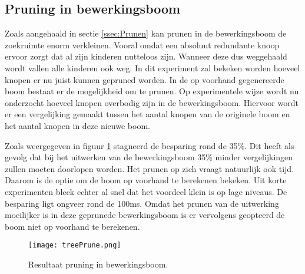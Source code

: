 \documentclass[Main.tex]{subfiles}
\begin{document}
\subsection{Pruning in bewerkingsboom} \label{ssec:pruning}
Zoals aangehaald in sectie \ref{ssec:Prunen} kan prunen in de bewerkingsboom de zoekruimte enorm verkleinen. Vooral omdat een absoluut redundante knoop ervoor zorgt dat al zijn kinderen nutteloos zijn. Wanneer deze dus weggehaald wordt vallen alle kinderen ook weg. In dit experiment zal bekeken worden hoeveel knopen er nu juist kunnen gepruned worden.
In de op voorhand gegenereerde boom bestaat er de mogelijkheid om te prunen. Op experimentele wijze wordt nu onderzocht hoeveel knopen overbodig zijn in de bewerkingsboom. Hiervoor wordt er een vergelijking gemaakt tussen het aantal knopen van de originele boom en het aantal knopen in deze nieuwe boom.
\par Zoals weergegeven in figuur \ref{fig:pruningInBewerkingsboom} stagneerd de besparing rond de 35\%. Dit heeft als gevolg dat bij het uitwerken van de bewerkingsboom 35\% minder vergelijkingen zullen moeten doorlopen worden. Het prunen op zich vraagt natuurlijk ook tijd. Daarom is de optie om de boom op voorhand te berekenen bekeken. Uit korte experimenten bleek echter al snel dat het voordeel klein is op lage niveaus. De besparing ligt ongveer rond de 100ms. Omdat het prunen van de uitwerking \\moeilijker is in deze geprunede bewerkingsboom is er vervolgens geopteerd de boom niet op voorhand te berekenen.
\begin{figure}
\centering
\texttt{[image: treePrune.png]} 
\caption{Resultaat pruning in bewerkingsboom.} \label{fig:pruningInBewerkingsboom}
\end{figure}
\end{document}
